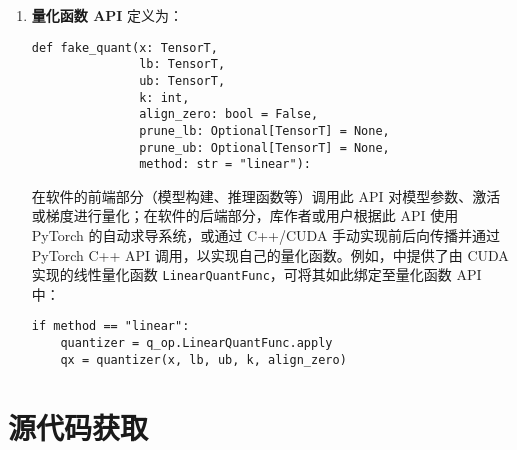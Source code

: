 \begin{enumerate}
  \item \textbf{量化函数 API} 定义为：
    \begin{verbatim}
def fake_quant(x: TensorT, 
               lb: TensorT, 
               ub: TensorT, 
               k: int,
               align_zero: bool = False,
               prune_lb: Optional[TensorT] = None,
               prune_ub: Optional[TensorT] = None,
               method: str = "linear"):
    \end{verbatim}
    在软件的前端部分（模型构建、推理函数等）调用此 API 对模型参数、激活或梯度进行量化；在软件的后端部分，库作者或用户根据此 API 使用 PyTorch 的自动求导系统，或通过 C++/CUDA 手动实现前后向传播并通过 PyTorch C++ API 调用，以实现自己的量化函数。例如，\QP 中提供了由 CUDA 实现的线性量化函数 \verb|LinearQuantFunc|，可将其如此绑定至量化函数 API 中：
    \begin{verbatim}
if method == "linear":
    quantizer = q_op.LinearQuantFunc.apply
    qx = quantizer(x, lb, ub, k, align_zero)
    \end{verbatim}
\end{enumerate}

\section{源代码获取}

